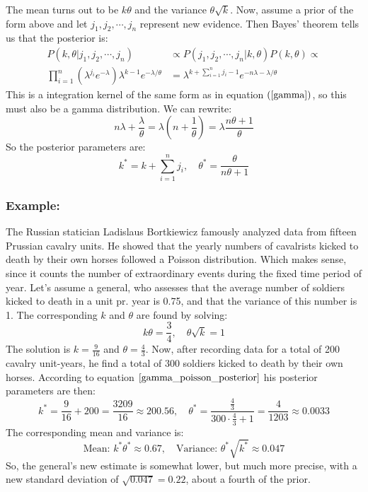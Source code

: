 \documentclass[12pt, a4paper]{article}
\begin{document}
The mean turns out to be $k\theta$ and the variance $\theta\sqrt{k}$. Now, assume a prior of the form above and let $j_1, j_2,\cdots,j_n$ represent new evidence. Then Bayes' theorem tells us that the posterior is:
\begin{align}
P(k,\theta|j_1, j_2,\cdots,j_n)&\propto P(j_1, j_2,\cdots,j_n|k,\theta)P(k,\theta)\propto\\
\prod_{i=1}^n\left(\lambda^{j_i}e^{-\lambda}\right)\lambda^{k-1}e^{-\lambda/\theta}&=\lambda^{k+\sum_{i=1}^n j_i-1}e^{-n\lambda-\lambda/\theta}
\end{align}
This is a integration kernel of the same form as in equation $(\ref{gamma})$, so this must also be a gamma distribution. We can rewrite:
\begin{equation}
n\lambda+\frac{\lambda}{\theta}=\lambda\left(n+\frac{1}{\theta}\right)=\lambda\frac{n\theta+1}{\theta}
\end{equation}
So the posterior parameters are:
\begin{equation}
\label{gamma_poisson_posterior}
k^*=k+\sum_{i=1}^n j_i,\quad\theta^*=\frac{\theta}{n\theta+1}
\end{equation}

\subsubsection{Example:}
The Russian statician Ladislaus Bortkiewicz famously analyzed data from fifteen Prussian cavalry units. He showed that the yearly numbers of cavalrists kicked to death by their own horses followed a Poisson distribution. Which makes sense, since it counts the number of extraordinary events during the fixed time period of year. Let's assume a general, who assesses that the average number of soldiers kicked to death in a unit pr. year is 0.75, and that the variance of this number is 1. The corresponding $k$ and $\theta$ are found by solving:
\begin{equation}
k\theta=\frac{3}{4},\quad\theta\sqrt{k}=1
\end{equation}
The solution is $k=\frac{9}{16}$ and $\theta=\frac{4}{3}$. Now, after recording data for a total of 200 cavalry unit-years, he find a total of 300 soldiers kicked to death by their own horses. According to equation $\ref{gamma_poisson_posterior}$ his posterior parameters are then:
\begin{equation}
k^*=\frac{9}{16}+200=\frac{3209}{16}\approx 200.56,\quad\theta^*=\frac{\frac{4}{3}}{300\cdot\frac{4}{3}+1}=\frac{4}{1203}\approx 0.0033
\end{equation}
The corresponding mean and variance is:
\begin{equation}
\textrm{Mean: }k^*\theta^*\approx0.67,\quad\textrm{Variance: }\theta^*\sqrt{k^*}\approx 0.047
\end{equation}
So, the general's new estimate is somewhat lower, but much more precise, with a new standard deviation of $\sqrt{0.047}=0.22$, about a fourth of the prior.
\end{document}

